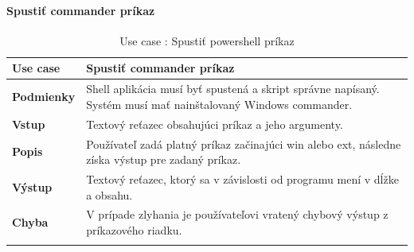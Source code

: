 \paragraph{Spustiť commander príkaz}
\begin{center}
	\begin{longtable}{|p{2.5cm}|p{12.2cm}|}

			\hline
			\textbf{Use case} & Spustiť commander príkaz \\ 
			\hline
			\textbf{Podmienky} & Shell aplikácia musí byť spustená a skript správne napísaný. Systém musí mať nainštalovaný Windows commander.\\ 
			\hline
			\textbf{Vstup} & Textový reťazec obsahujúci príkaz a jeho argumenty.\\
			\hline
			\textbf{Popis} & Používateľ zadá platný príkaz začinajúci win alebo ext, následne získa výstup pre zadaný príkaz. \\ 
			\hline
			\textbf{Výstup} &Textový reťazec, ktorý sa v závislosti od programu mení v dĺžke a obsahu. \\
			\hline
			\textbf{Chyba} & V prípade zlyhania je používateľovi vratený chybový výstup z príkazového riadku.\\
			\hline
	\caption{Use case : Spustiť powershell príkaz}
	\label{table:1}

	\end{longtable}
\end{center}
